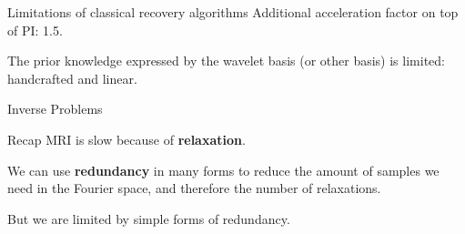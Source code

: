 



\begin{frame}{Limitations of classical recovery algorithms}
    Additional acceleration factor on top of PI: 1.5. %

    \pause
    The prior knowledge expressed by the wavelet basis (or other basis) is limited: handcrafted and linear.
\end{frame}

\begin{frame}{Inverse Problems}
    \begin{block}{Recap}
        MRI is slow because of \textbf{relaxation}.

        \pause
        We can use \textbf{redundancy} in many forms to reduce the amount of samples we need in the Fourier space, and therefore the number of relaxations.

        \pause
        But we are limited by simple forms of redundancy.
    \end{block}
\end{frame}

